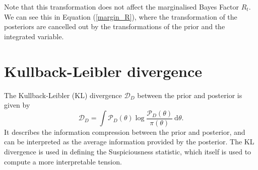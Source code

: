 \documentclass[%
 reprint,
 amsmath,amssymb,
 aps,
]{revtex4-2}
\begin{document}
Note that this transformation does not affect the marginalised Bayes Factor $R_t$. We can see this in Equation (\ref{margin_R}), where the transformation of the posteriors are cancelled out by the transformations of the prior and the integrated variable.


\section{Kullback-Leibler divergence} \label{appendix:kl_divergence}

The Kullback-Leibler (KL) divergence \cite{Kullback1951} $\mathcal{D}_D$ between the prior and posterior is given by
\begin{equation}
    \mathcal{D}_D = \int \mathcal{P}_D (\theta) \log \frac{\mathcal{P}_D (\theta)}{\pi(\theta)} \ \textrm{d}\theta.
\end{equation}
It describes the information compression between the prior and posterior, and can be interpreted as the average information provided by the posterior. The KL divergence is used in defining the Suspiciousness statistic, which itself is used to compute a more interpretable tension.


\end{document}
